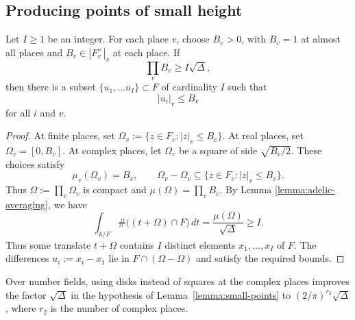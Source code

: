 \documentclass[reqno]{amsart} 
\begin{document}
\subsection{Producing points of small height}\label{sec:cus71nhoyd}

\begin{lemma}\label{lemma:small-points}
  Let $I\geq1$ be an integer.  For each place $v$, choose $B_v>0$, with $B_v=1$ at almost all places and $B_v\in|F_v^\times|_v$ at each place.  If
  \begin{equation*}
    \prod_v B_v\geq I\sqrt\Delta,
  \end{equation*}
  then there is a subset $\{u_1, \dotsc u_I\} \subset F$ of cardinality $I$ such that
  \begin{equation*}
    |u_i|_v\leq B_v
  \end{equation*}
  for all $i$ and $v$.
\end{lemma}
\begin{proof}
  At finite places, set $\Omega_v:=\{z\in F_v:|z|_v\leq B_v\}$.  At real places, set $\Omega_v=[0,B_v]$.  At complex places, let $\Omega_v$ be a square of side $\sqrt{B_v/2}$.  These choices satisfy
  \begin{equation*}
    \mu_v(\Omega_v)=B_v,\qquad
    \Omega_v-\Omega_v\subseteq\{z\in F_v:|z|_v\leq B_v\}.
  \end{equation*}
  Thus $\Omega:=\prod_v\Omega_v$ is compact and $\mu(\Omega)=\prod_vB_v$.  By Lemma \ref{lemma:adelic-averaging}, we have
  \begin{equation*}
    \int_{\mathbb{A}/F}\#\bigl((t+\Omega)\cap F\bigr)\,dt
    =\frac{\mu(\Omega)}{\sqrt\Delta}\geq I.
  \end{equation*}
  Thus some translate $t + \Omega$ contains $I$ distinct elements $x_1, \dotsc, x_I$ of $F$.  The differences $u_i := x_i - x_1$ lie in $F\cap(\Omega-\Omega)$ and satisfy the required bounds.
\end{proof}

\begin{remark}
  Over number fields, using disks instead of squares at the complex places improves the factor \(\sqrt{\Delta}\) in the hypothesis of Lemma~\ref{lemma:small-points} to \((2/\pi)^{r_2}\sqrt{\Delta}\), where \(r_2\) is the number of complex places.
\end{remark}
\end{document}
